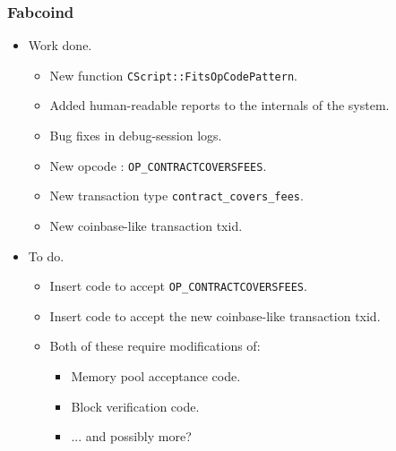 \begin{frame}[fragile]
\frametitle{Fabcoind}
\begin{itemize}
\item Work done.
\begin{itemize}
\item New function \verb|CScript::FitsOpCodePattern|.
\item Added human-readable reports to the internals of the system.
\item Bug fixes in debug-session logs. 
\item New opcode : \verb|OP_CONTRACTCOVERSFEES|.
\item New transaction type \verb|contract_covers_fees|. 
\item New coinbase-like transaction txid.
\end{itemize}
\item To do.
\begin{itemize}
\item Insert code to accept \verb|OP_CONTRACTCOVERSFEES|. 
\item Insert code to accept the new coinbase-like transaction txid.
\item Both of these require modifications of:
\begin{itemize}
\item Memory pool acceptance code.
\item Block verification code.
\item ... and possibly more?
\end{itemize}
\end{itemize}
\end{itemize}

\end{frame}